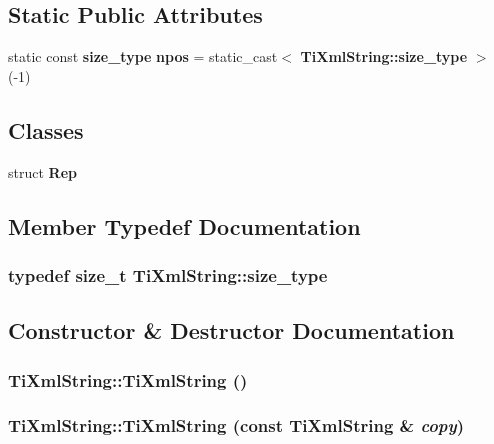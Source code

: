 \subsection*{Static Public Attributes}
\begin{CompactItemize}
\item 
static const {\bf size\_\-type} {\bf npos} = static\_\-cast$<$ {\bf TiXmlString::size\_\-type} $>$(-1)
\end{CompactItemize}
\subsection*{Classes}
\begin{CompactItemize}
\item 
struct \textbf{Rep}
\end{CompactItemize}


\subsection{Member Typedef Documentation}
\subsubsection{\setlength{\rightskip}{0pt plus 5cm}typedef size\_\-t {\bf TiXmlString::size\_\-type}}\label{classTiXmlString_beb2c1893a04c17904f7c06546d0b971}




\subsection{Constructor \& Destructor Documentation}
\subsubsection{\setlength{\rightskip}{0pt plus 5cm}TiXmlString::TiXmlString ()\hspace{0.3cm}{\tt  [inline]}}\label{classTiXmlString_342f61e0fc2244df300b73aedf6d3fef}


\subsubsection{\setlength{\rightskip}{0pt plus 5cm}TiXmlString::TiXmlString (const {\bf TiXmlString} \& {\em copy})\hspace{0.3cm}{\tt  [inline]}}\label{classTiXmlString_c80fe17693a438c9ab2591664743fcb6}


